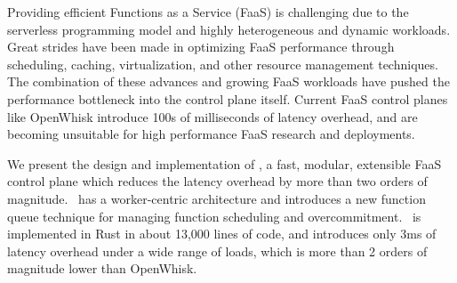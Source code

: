 
Providing efficient Functions as a Service (FaaS) is challenging due to the serverless programming model and highly heterogeneous and dynamic workloads. 
Great strides have been made in optimizing FaaS performance through scheduling, caching, virtualization, and other resource management techniques.
The combination of these advances and growing FaaS workloads have pushed the performance bottleneck into the control plane itself.
Current FaaS control planes like OpenWhisk introduce 100s of milliseconds of latency overhead, and are becoming unsuitable for high performance FaaS research and deployments.

We present the design and implementation of \sysname, a fast, modular, extensible FaaS control plane which reduces the latency overhead by more than two orders of magnitude.
\sysname~has a worker-centric architecture and introduces a new function queue technique for managing function scheduling and overcommitment. 
\sysname~is implemented in Rust in about 13,000 lines of code, and introduces only 3ms of latency overhead under a wide range of loads, which is more than 2 orders of magnitude lower than OpenWhisk. 


